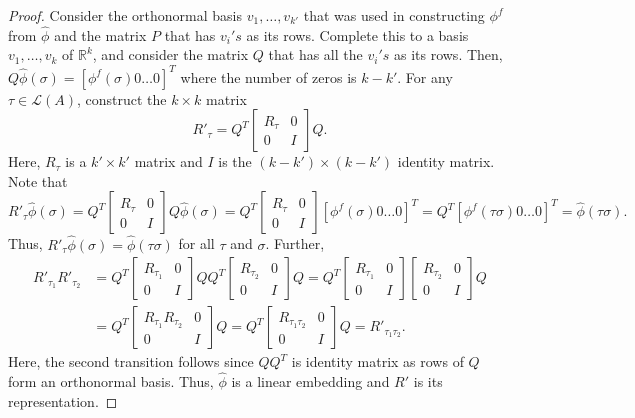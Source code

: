 \documentclass[prodmode,acmec]{ec-acmsmall}
\newcommand{\calL}{{\mathcal{L}}}
\newcommand{\rank}{{\calL(A)}}
\begin{document}
\begin{proof}
Consider the orthonormal basis $v_1,\ldots,v_{k'}$ that was used in constructing $\phi^f$ from $\hat{\phi}$ and the matrix $P$ that has $v_i's$ as its rows. Complete this to a basis $v_1,\ldots,v_k$ of $\mathbb{R}^k$, and consider the matrix $Q$ that has all the $v_i's$ as its rows. Then, $Q \hat{\phi}(\sigma) = [\phi^f(\sigma) 0 \ldots 0]^T$ where the number of zeros is $k-k'$. For any $\tau \in \rank$, construct the $k \times k$ matrix 
$$
R'_{\tau} = Q^T \left[ \begin{smallmatrix} R_{\tau} & 0 \\ 0 & I \end{smallmatrix} \right] Q. 
$$
Here, $R_{\tau}$ is a $k' \times k'$ matrix and $I$ is the $(k-k') \times (k-k')$ identity matrix. Note that 
$$
R'_{\tau} \hat{\phi}(\sigma) = Q^T \left[ \begin{smallmatrix} R_{\tau} & 0 \\ 0 & I \end{smallmatrix} \right] Q \hat{\phi}(\sigma) = Q^T \left[ \begin{smallmatrix} R_{\tau} & 0 \\ 0 & I \end{smallmatrix} \right] [\phi^f(\sigma) 0 \ldots 0]^T = Q^T [\phi^f(\tau \sigma) 0 \ldots 0]^T = \hat{\phi}(\tau \sigma).
$$
Thus, $R'_{\tau} \hat{\phi}(\sigma) = \hat{\phi}(\tau \sigma)$ for all $\tau$ and $\sigma$. Further, 
\begin{align*}
R'_{\tau_1} R'_{\tau_2} &= Q^T \left[ \begin{smallmatrix} R_{\tau_1} & 0 \\ 0 & I \end{smallmatrix} \right] Q Q^T \left[ \begin{smallmatrix} R_{\tau_2} & 0 \\ 0 & I \end{smallmatrix} \right] Q = Q^T \left[ \begin{smallmatrix} R_{\tau_1} & 0 \\ 0 & I \end{smallmatrix} \right] \left[ \begin{smallmatrix} R_{\tau_2} & 0 \\ 0 & I \end{smallmatrix} \right] Q \\
&= Q^T \left[ \begin{smallmatrix} R_{\tau_1} R_{\tau_2} & 0 \\ 0 & I \end{smallmatrix} \right] Q = Q^T \left[ \begin{smallmatrix} R_{\tau_1 \tau_2} & 0 \\ 0 & I \end{smallmatrix} \right] Q = R'_{\tau_1 \tau_2}.
\end{align*}
Here, the second transition follows since $Q Q^T$ is identity matrix as rows of $Q$ form an orthonormal basis. Thus, $\hat{\phi}$ is a linear embedding and $R'$ is its representation.
\end{proof}
\end{document}
